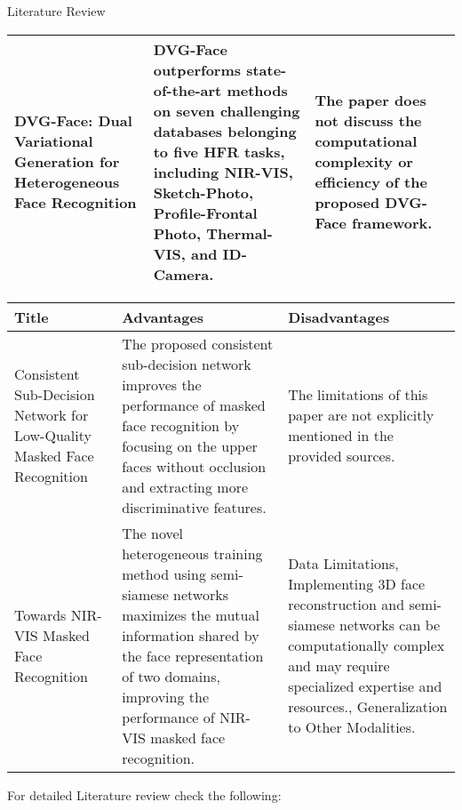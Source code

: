 \begin{frame}[allowframebreaks]{Literature Review}
{\begin{table}[htbp]
\begin{center}
\begin{tabularx}{\columnwidth}{|X|X|X|}
			\\
			\hline
			DVG-Face: Dual Variational Generation for Heterogeneous Face Recognition & DVG-Face outperforms state-of-the-art methods on seven challenging databases belonging to five HFR tasks, including NIR-VIS, Sketch-Photo, Profile-Frontal Photo, Thermal-VIS, and ID-Camera. & The paper does not discuss the computational complexity or efficiency of the proposed DVG-Face framework.			\\
			\hline
		\end{tabularx}
		\end{center}
		\end{table}	
	\pagebreak	
		\begin{table}[htbp]
			\begin{center}
			\begin{tabularx}{\columnwidth}{|X|X|X|}
			\hline
			\textbf{Title} & \textbf{Advantages}& \textbf{Disadvantages} \\
			\hline
			Consistent Sub-Decision Network for Low-Quality Masked Face Recognition & The proposed consistent sub-decision network improves the performance of masked face recognition by focusing on the upper faces without occlusion and extracting more discriminative features. & The limitations of this paper are not explicitly mentioned in the provided sources.
			\\
			\hline
			Towards NIR-VIS Masked Face Recognition & The novel heterogeneous training method using semi-siamese networks maximizes the mutual information shared by the face representation of two domains, improving the performance of NIR-VIS masked face recognition. & Data Limitations,  Implementing 3D face reconstruction and semi-siamese networks can be computationally complex and may require specialized expertise and resources., Generalization to Other Modalities.		\\
			\hline
		\end{tabularx}
		\end{center}
		\end{table}		
		For detailed Literature review check the following: \textcolor{blue}{\underline{}}
	}	
\end{frame}

